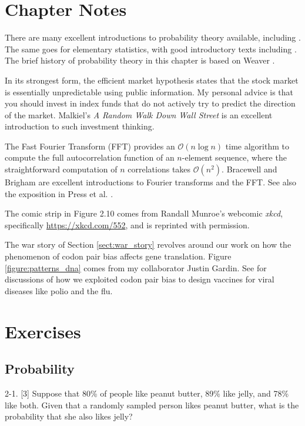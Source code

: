 \documentclass[10pt]{article}
\begin{document}
\section{Chapter Notes}
\label{sect:chapter_notes}
There are many excellent introductions to probability theory available, including \cite{Tij12, BT08}. The same goes for elementary statistics, with good introductory texts including \cite{JWHT13, Whe13}. The brief history of probability theory in this chapter is based on Weaver \cite{Wea82}.

In its strongest form, the efficient market hypothesis states that the stock market is essentially unpredictable using public information. My personal advice is that you should invest in index funds that do not actively try to predict the direction of the market. Malkiel’s \textit{A Random Walk Down Wall Street} \cite{Mal99} is an excellent introduction to such investment thinking. 

The Fast Fourier Transform (FFT) provides an $\mathcal{O}(n \log n)$ time algorithm to compute the full autocorrelation function of an $n$-element sequence, where the straightforward computation of $n$ correlations takes $\mathcal{O}(n^2)$. Bracewell \cite{Bra99} and Brigham \cite{Bri88} are excellent introductions to Fourier transforms and the FFT. See also the exposition in Press et al. \cite{PFTV07}.

The comic strip in Figure 2.10 comes from Randall Munroe’s webcomic \textit{xkcd}, specifically \href{https://xkcd.com/552}{https://xkcd.com/552}, and is reprinted with permission.

The war story of Section \ref{sect:war_story} revolves around our work on how the phenomenon of codon pair bias affects gene translation. Figure \ref{figure:patterns_dna} comes from my collaborator Justin Gardin. See \cite{CPS08, MCP10, Ski12} for discussions of how we exploited codon pair bias to design vaccines for viral diseases like polio and the flu.

\section{Exercises}
\subsection{Probability}
2-1. [3] Suppose that 80\% of people like peanut butter, 89\% like jelly, and 78\% like both. Given that a randomly sampled person likes peanut butter, what is the probability that she also likes jelly?\\[0pt]
\end{document}
